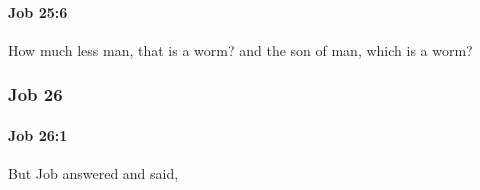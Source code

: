 		\paragraph{Job 25:6} %
			\label{JOB-25-6}

			How much less man, that is a worm? and the son of man, which is a worm?

	\subsubsection{Job 26} %
		\label{JOB-26}

		\paragraph{Job 26:1} %
			\label{JOB-26-1}

			But Job answered and said,


